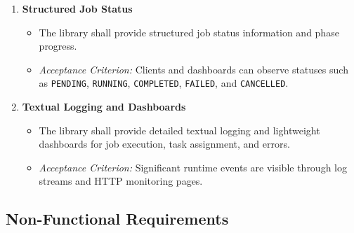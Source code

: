 \documentclass{scrartcl}
\begin{document}
\begin{enumerate}[label=\textbf{FR-MON-\arabic*}]
    \item \textbf{Structured Job Status}
          \begin{itemize}
              \item The library shall provide structured job status information and phase progress.
              \item \textit{Acceptance Criterion:} Clients and dashboards can observe statuses such as \texttt{PENDING}, \texttt{RUNNING}, \texttt{COMPLETED}, \texttt{FAILED}, and \texttt{CANCELLED}.
          \end{itemize}

    \item \textbf{Textual Logging and Dashboards}
          \begin{itemize}
              \item The library shall provide detailed textual logging and lightweight dashboards for job execution, task assignment, and errors.
              \item \textit{Acceptance Criterion:} Significant runtime events are visible through log streams and HTTP monitoring pages.
          \end{itemize}

\end{enumerate}

\subsection{Non-Functional Requirements}
\end{document}
